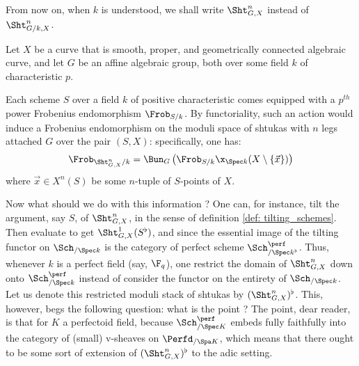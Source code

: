                 \begin{convention}
                    From now on, when $k$ is understood, we shall write $\Sht^n_{G, X}$ instead of $\Sht^n_{G/k, X}$.
                \end{convention}
                
                \begin{remark} \label{remark: frobenii_on_shtukas}
                    Let $X$ be a curve that is smooth, proper, and geometrically connected algebraic curve, and let $G$ be an affine algebraic group, both over some field $k$ of characteristic $p$.
                    
                    Each scheme $S$ over a field $k$ of positive characteristic comes equipped with a $p^{th}$ power Frobenius endomorphism $\Frob_{S/k}$. By functoriality, such an action would induce a Frobenius endomorphism on the moduli space of shtukas with $n$ legs attached $G$ over the pair $(S, X)$: specifically, one has:
                        $$\Frob_{\Sht^n_{G, X}/k} = \Bun_G\left(\Frob_{S/k} \x_{\Spec k} (X \setminus \{\vec{x}\})\right)$$
                    where $\vec{x} \in X^n(S)$ be some $n$-tuple of $S$-points of $X$. 
                    
                    Now what should we do with this information ? One can, for instance, tilt the argument, say $S$, of $\Sht^n_{G, X}$, in the sense of definition \ref{def: tilting_schemes}. Then evaluate to get $\Sht^1_{G, X}(S^{\flat})$, and since the essential image of the tilting functor on $\Sch_{/\Spec k}$ is the category of perfect scheme $\Sch^{\perf}_{/\Spec k^{\flat}}$. Thus, whenever $k$ is a perfect field (say, $\F_q$), one restrict the domain of $\Sht^n_{G, X}$ down onto $\Sch^{\perf}_{/\Spec k}$ instead of consider the functor on the entirety of $\Sch_{/\Spec k}$. Let us denote this restricted moduli stack of shtukas by $(\Sht^n_{G, X})^{\flat}$. This, however, begs the following question: what is the point ? The point, dear reader, is that for $K$ a perfectoid field, because $\Sch^{\perf}_{/\Spec K}$ embeds fully faithfully into the category of (small) v-sheaves on $\Perfd_{/\Spa K}$, which means that there ought to be some sort of extension of $(\Sht^n_{G, X})^{\flat}$ to the adic setting. 
                \end{remark}
            

